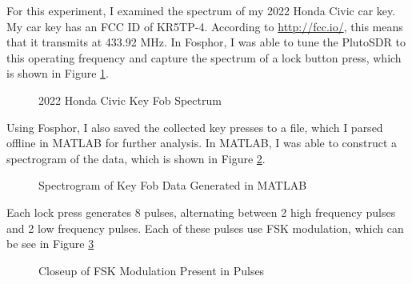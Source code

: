 \documentclass{article}
\begin{document}
For this experiment, I examined the spectrum of my 2022 Honda Civic car key. My car key has an FCC ID of KR5TP-4. According to \url{http://fcc.io/}, this means that it transmits at 433.92 MHz. In Fosphor, I was able to tune the PlutoSDR to this operating frequency and capture the spectrum of a lock button press, which is shown in Figure \ref{fig::car_key_spectrum}.

\begin{figure}[H]
	\centerline{}
	\caption{2022 Honda Civic Key Fob Spectrum}
	\label{fig::car_key_spectrum}
\end{figure}

Using Fosphor, I also saved the collected key presses to a file, which I parsed offline in MATLAB for further analysis. In MATLAB, I was able to construct a spectrogram of the data, which is shown in Figure \ref{fig::car_key_spectrogram}.

\begin{figure}[H]
	\centerline{}
	\caption{Spectrogram of Key Fob Data Generated in MATLAB}
	\label{fig::car_key_spectrogram}
\end{figure}

Each lock press generates 8 pulses, alternating between 2 high frequency pulses and 2 low frequency pulses. Each of these pulses use FSK modulation, which can be see in Figure \ref{fig::car_key_spectrogram_focus}

\begin{figure}[H]
	\centerline{}
	\caption{Closeup of FSK Modulation Present in Pulses}
	\label{fig::car_key_spectrogram_focus}
\end{figure}
\end{document}
